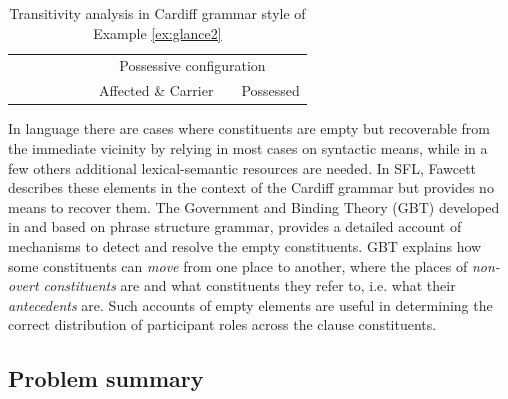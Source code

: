 \begin{table}[!ht]
{\begin{tabular}{cccccc|c|c|c|c|c|}
            &                             &                                      &                         & \multicolumn{1}{c|}{}               & \multicolumn{6}{c|}{Possessive configuration}                                                         \\ \cline{6-11} 
            &                             &                                      &                         &                                     &                & Affected \& Carrier &                  & \multicolumn{3}{c|}{Possessed}                 \\ \cline{7-7} \cline{9-11} 
        \end{tabular}%
    }
    \caption{Transitivity analysis in Cardiff grammar style \citep{Neale2002,Fawcett2009} of Example \ref{ex:glance2}} 
    \label{tab:glance-analsys-semantic}
\end{table}

In language there are cases where constituents are empty but recoverable from the immediate vicinity by relying in most cases on syntactic means, while in a few others additional lexical-semantic resources are needed.
In SFL, Fawcett describes these elements in the context of the Cardiff grammar \citep[115,135,194]{Fawcett2008} but provides no means to recover them. The Government and Binding Theory (GBT) developed in \citet{Chomsky81, Chomsky1982, Chomsky1986} and based on phrase structure grammar, provides a detailed account of mechanisms to detect and resolve the empty constituents. GBT explains how some constituents can \textit{move} from one place to another, where the places of \textit{non-overt constituents} are and what constituents they refer to, i.e. what their \textit{antecedents} are. Such accounts of empty elements are useful in determining the correct distribution of participant roles across the clause constituents.

\subsection{Problem summary}

